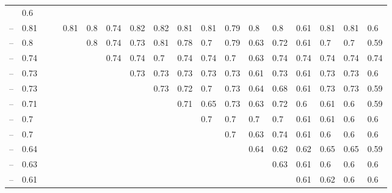 \documentclass[11pt]{article} %
\begin{document}
\begin{table}[H]
\begin{adjustbox}{max width=\textwidth,max totalheight=\textheight,keepaspectratio}
\begin{tabular}{lHHHHHHHHHHHHHHHHH}
    & 0.6     \\
	 -- \NMIAMg            & 0.81                     &        &        & 0.81   & 0.8    & 0.74   & 0.82   & 0.82   & 0.81   & 0.81   & 0.79    & 0.8     & 0.8     & 0.61    & 0.81    & 0.81    & 0.6     \\
	 -- \NMIA              & 0.8                      &        &        &        & 0.8    & 0.74   & 0.73   & 0.81   & 0.78   & 0.7    & 0.79    & 0.63    & 0.72    & 0.61    & 0.7     & 0.7     & 0.59    \\
	 -- \OneMSevILUThreeMg & 0.74                     &        &        &        &        & 0.74   & 0.74   & 0.7    & 0.74   & 0.74   & 0.7     & 0.63    & 0.74    & 0.74    & 0.74    & 0.74    & 0.74    \\
	 -- \NMIAMgCE          & 0.73                     &        &        &        &        &        & 0.73   & 0.73   & 0.73   & 0.73   & 0.73    & 0.61    & 0.73    & 0.61    & 0.73    & 0.73    & 0.6     \\
	 -- \NAIMg             & 0.73                     &        &        &        &        &        &        & 0.73   & 0.72   & 0.7    & 0.73    & 0.64    & 0.68    & 0.61    & 0.73    & 0.73    & 0.59    \\
	 -- \BzCNMg            & 0.71                     &        &        &        &        &        &        &        & 0.71   & 0.65   & 0.73    & 0.63    & 0.72    & 0.6     & 0.61    & 0.6     & 0.59    \\
	 -- \OneMSevMgCE       & 0.7                      &        &        &        &        &        &        &        &        & 0.7    & 0.7     & 0.7     & 0.7     & 0.61    & 0.61    & 0.6     & 0.6     \\
	 -- \CMCTMg           & 0.7                      &        &        &        &        &        &        &        &        &        & 0.7     & 0.63    & 0.74    & 0.61    & 0.6     & 0.6     & 0.6     \\
	 -- \OneMSevILUThree  & 0.64                     &        &        &        &        &        &        &        &        &        &         & 0.64    & 0.62    & 0.62    & 0.65    & 0.65    & 0.59    \\
	 -- \DMSMg            & 0.63                     &        &        &        &        &        &        &        &        &        &         &         & 0.63    & 0.61    & 0.6     & 0.6     & 0.6     \\
	 -- \NMIACE           & 0.61                     &        &        &        &        &        &        &        &        &        &         &         &         & 0.61    & 0.62    & 0.6     & 0.6     \\

\end{tabular}
\end{adjustbox}
\end{table}
\end{document}
